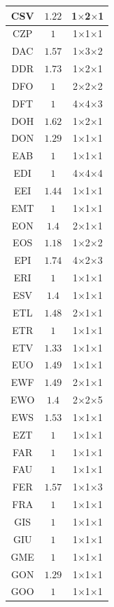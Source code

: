 \documentclass[main.tex]{subfiles}
\begin{document}
\begin{table}
{\begin{minipage}[t]{0.24\linewidth}
\begin{tabular}{|@{\hspace{2pt}}c@{\hspace{2pt}}|@{\hspace{2pt}}c@{\hspace{2pt}}|@{\hspace{2pt}}c@{\hspace{2pt}}|}
CSV&$1.22$&1$\times$2$\times$1\\\hline
CZP&$1$&1$\times$1$\times$1\\\hline
DAC&$1.57$&1$\times$3$\times$2\\\hline
DDR&$1.73$&1$\times$2$\times$1\\\hline
DFO&$1$&2$\times$2$\times$2\\\hline
DFT&$1$&4$\times$4$\times$3\\\hline
DOH&$1.62$&1$\times$2$\times$1\\\hline
DON&$1.29$&1$\times$1$\times$1\\\hline
EAB&$1$&1$\times$1$\times$1\\\hline
EDI&$1$&4$\times$4$\times$4\\\hline
EEI&$1.44$&1$\times$1$\times$1\\\hline
EMT&$1$&1$\times$1$\times$1\\\hline
EON&$1.4$&2$\times$1$\times$1\\\hline
EOS&$1.18$&1$\times$2$\times$2\\\hline
EPI&$1.74$&4$\times$2$\times$3\\\hline
ERI&$1$&1$\times$1$\times$1\\\hline
ESV&$1.4$&1$\times$1$\times$1\\\hline
ETL&$1.48$&2$\times$1$\times$1\\\hline
ETR&$1$&1$\times$1$\times$1\\\hline
ETV&$1.33$&1$\times$1$\times$1\\\hline
EUO&$1.49$&1$\times$1$\times$1\\\hline
EWF&$1.49$&2$\times$1$\times$1\\\hline
EWO&$1.4$&2$\times$2$\times$5\\\hline
EWS&$1.53$&1$\times$1$\times$1\\\hline
EZT&$1$&1$\times$1$\times$1\\\hline
FAR&$1$&1$\times$1$\times$1\\\hline
FAU&$1$&1$\times$1$\times$1\\\hline
FER&$1.57$&1$\times$1$\times$3\\\hline
FRA&$1$&1$\times$1$\times$1\\\hline
GIS&$1$&1$\times$1$\times$1\\\hline
GIU&$1$&1$\times$1$\times$1\\\hline
GME&$1$&1$\times$1$\times$1\\\hline
GON&$1.29$&1$\times$1$\times$1\\\hline
GOO&$1$&1$\times$1$\times$1\\\hline

\end{tabular}
\end{minipage}}
\end{table}
\end{document}
